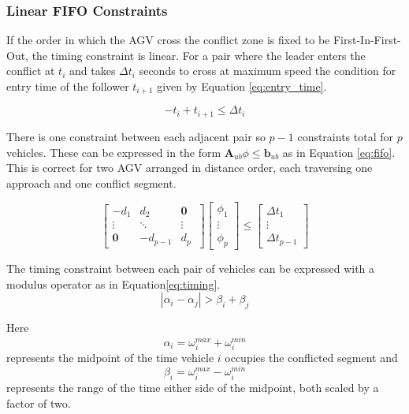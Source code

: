 \documentclass[]{article}
\begin{document}
\subsubsection{Linear FIFO Constraints}
\label{sec:fifo_constraints}
If the order in which the AGV cross the conflict zone is fixed to be First-In-First-Out, the timing constraint is linear. For a pair where the leader enters the conflict at $t_i$ and takes $\Delta t_i$ seconds to cross at maximum speed the condition for entry time of the follower $t_{i+1}$ given by Equation \ref{eq:entry_time}.

\begin{equation}
	-t_{i} + t_{i+1}	\leq	\Delta t_i
	\label{eq:entry_time} 
\end{equation} 

There is one constraint between each adjacent pair so $p-1$ constraints total for $p$ vehicles. These can be expressed in the form $\bm{A}_{ub}\phi \leq \bm{b}_{ub}$ as in Equation \ref{eq:fifo}. This is correct for two AGV arranged in distance order, each traversing one approach and one conflict segment. 



\begin{equation}
	\left[ 
	\begin{array}{ccccc}
		-d_1 & d_2 & \bm{0}\\
		\vdots & \ddots & \vdots \\
		\bm{0} & -d_{p-1} & d_p\
	\end{array} \right]
	\left[
	\begin{array}{c}
		\phi_1 \\ \vdots \\ \phi_p
	\end{array} \right]
	\leq
	\left[ 
	\begin{array}{c}
		\Delta t_1 \\
		\vdots \\
		\Delta t_{p-1}
	\end{array} \right]
	\label{eq:fifo}
\end{equation}

The timing constraint between each pair of vehicles can be expressed with a modulus operator as in Equation\ref{eq:timing}.
\begin{equation}
	|\alpha_i - \alpha_j| > \beta_i + \beta_j
	\label{eq:timing}
\end{equation}

Here 
\begin{equation}
	\alpha_i  = \omega_i^{max} + \omega_i^{min}
	\label{eq:alpha}
\end{equation}
represents the midpoint of the time vehicle $i$ occupies the conflicted segment and
\begin{equation}
	\beta_i  = \omega_i^{max} - \omega_i^{min}
	\label{eq:beta}
\end{equation}
represents the range of the time either side of the midpoint, both scaled by a factor of two. 
\end{document}
